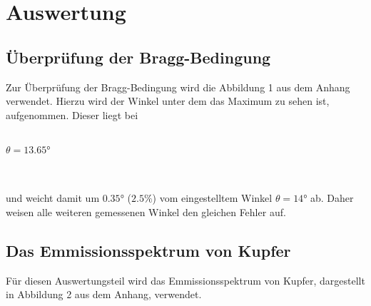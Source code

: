 \section{Auswertung}
\label{sec:Auswertung}

\subsection{Überprüfung der Bragg-Bedingung}
    Zur Überprüfung der Bragg-Bedingung wird die Abbildung 1 aus dem Anhang verwendet. 
    Hierzu wird der Winkel unter dem das Maximum zu sehen ist, aufgenommen. Dieser liegt bei 
    \\ \\
    \centerline{$\theta = 13.65°$}
    \\ \\
    und weicht damit um $0.35°$ ($2.5\%$) vom eingestelltem Winkel $\theta = 14°$ ab.
    Daher weisen alle weiteren gemessenen Winkel den gleichen Fehler auf.

\subsection{Das Emmissionsspektrum von Kupfer}
    Für diesen Auswertungsteil wird das Emmissionsspektrum von Kupfer, dargestellt in Abbildung 2
    aus dem Anhang, verwendet. 
